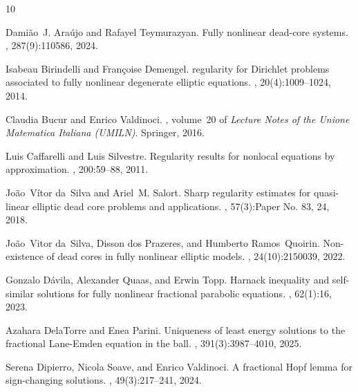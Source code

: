 \documentclass[11pt]{article}
\begin{document}


\begin{thebibliography}{10}

Dami{\~a}o~J. Ara{\'u}jo and Rafayel Teymurazyan.
\newblock Fully nonlinear dead-core systems.
, 287(9):110586, 2024.

Isabeau Birindelli and Fran{\c{c}}oise Demengel.
 regularity for {D}irichlet problems associated to fully nonlinear degenerate elliptic equations.
, 20(4):1009--1024, 2014.

Claudia Bucur and Enrico Valdinoci.
, volume~20 of {\em Lecture Notes of the Unione Matematica Italiana (UMILN)}.
\newblock Springer, 2016.

Luis Caffarelli and Luis Silvestre.
\newblock Regularity results for nonlocal equations by approximation.
, 200:59--88, 2011.

Jo\~ao~V\'itor da~Silva and Ariel~M. Salort.
\newblock Sharp regularity estimates for quasi-linear elliptic dead core problems and applications.
, 57(3):Paper No. 83, 24, 2018.

Jo{\~a}o~Vitor da~Silva, Disson dos Prazeres, and Humberto Ramos~Quoirin.
\newblock Non-existence of dead cores in fully nonlinear elliptic models.
, 24(10):2150039, 2022.

Gonzalo D{\'a}vila, Alexander Quaas, and Erwin Topp.
\newblock Harnack inequality and self-similar solutions for fully nonlinear fractional parabolic equations.
, 62(1):16, 2023.

Azahara DelaTorre and Enea Parini.
\newblock Uniqueness of least energy solutions to the fractional {L}ane-{E}mden equation in the ball.
, 391(3):3987--4010, 2025.

Serena Dipierro, Nicola Soave, and Enrico Valdinoci.
\newblock A fractional {H}opf lemma for sign-changing solutions.
, 49(3):217--241, 2024.


\end{thebibliography}
\end{document}
